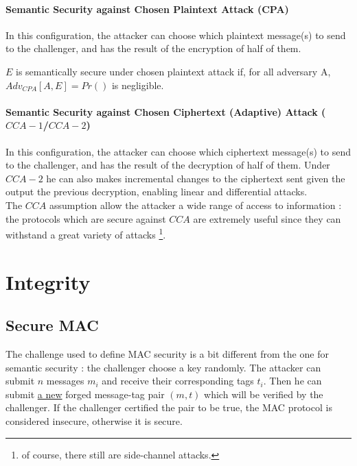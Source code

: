 \paragraph{Semantic Security against Chosen Plaintext Attack (CPA)\\}

In this configuration, the attacker can choose which plaintext message(s) to send to the challenger, and has the result of the encryption of half of them. 

\begin{mytheorem}
    $E$ is semantically secure  under chosen plaintext attack if, for all adversary A, $Adv_{CPA}[A,E] = Pr()$ is negligible.
\end{mytheorem}

\paragraph{Semantic Security against Chosen Ciphertext (Adaptive) Attack ($CCA-1$/$CCA-2$)\\}

In this configuration, the attacker can choose which ciphertext message(s) to send to the challenger, and has the result of the decryption of half of them. Under $CCA-2$ he can also makes incremental changes to the ciphertext sent given the output the previous decryption, enabling linear and differential attacks. \\
The $CCA$ assumption allow the attacker a wide range of access to information : the protocols which are secure against $CCA$ are extremely useful since they can withstand a great variety of attacks \footnote{of course, there still are side-channel attacks.}.

\section{Integrity}

\subsection{Secure MAC}

The challenge used to define MAC security is a bit different from the one for semantic security : the challenger choose a key randomly. The attacker can submit $n$ messages $m_i$ and receive their corresponding tags $t_i$. Then he can submit \underline{a new} forged message-tag pair $(m,t)$ which will be verified by the challenger. If the challenger certified the pair to be true, the MAC protocol is considered insecure, otherwise it is secure.

